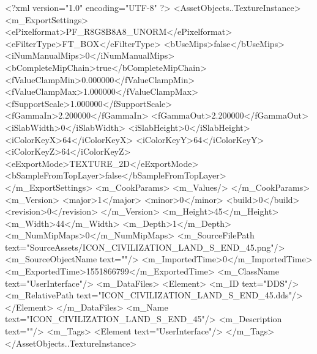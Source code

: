 <?xml version="1.0" encoding="UTF-8" ?>
<AssetObjects..TextureInstance>
	<m_ExportSettings>
		<ePixelformat>PF_R8G8B8A8_UNORM</ePixelformat>
		<eFilterType>FT_BOX</eFilterType>
		<bUseMips>false</bUseMips>
		<iNumManualMips>0</iNumManualMips>
		<bCompleteMipChain>true</bCompleteMipChain>
		<fValueClampMin>0.000000</fValueClampMin>
		<fValueClampMax>1.000000</fValueClampMax>
		<fSupportScale>1.000000</fSupportScale>
		<fGammaIn>2.200000</fGammaIn>
		<fGammaOut>2.200000</fGammaOut>
		<iSlabWidth>0</iSlabWidth>
		<iSlabHeight>0</iSlabHeight>
		<iColorKeyX>64</iColorKeyX>
		<iColorKeyY>64</iColorKeyY>
		<iColorKeyZ>64</iColorKeyZ>
		<eExportMode>TEXTURE_2D</eExportMode>
		<bSampleFromTopLayer>false</bSampleFromTopLayer>
	</m_ExportSettings>
	<m_CookParams>
		<m_Values/>
	</m_CookParams>
	<m_Version>
		<major>1</major>
		<minor>0</minor>
		<build>0</build>
		<revision>0</revision>
	</m_Version>
	<m_Height>45</m_Height>
	<m_Width>44</m_Width>
	<m_Depth>1</m_Depth>
	<m_NumMipMaps>0</m_NumMipMaps>
	<m_SourceFilePath text="SourceAssets/ICON_CIVILIZATION_LAND_S_END_45.png"/>
	<m_SourceObjectName text=""/>
	<m_ImportedTime>0</m_ImportedTime>
	<m_ExportedTime>1551866799</m_ExportedTime>
	<m_ClassName text="UserInterface"/>
	<m_DataFiles>
		<Element>
			<m_ID text="DDS"/>
			<m_RelativePath text="ICON_CIVILIZATION_LAND_S_END_45.dds"/>
		</Element>
	</m_DataFiles>
	<m_Name text="ICON_CIVILIZATION_LAND_S_END_45"/>
	<m_Description text=""/>
	<m_Tags>
		<Element text="UserInterface"/>
	</m_Tags>
</AssetObjects..TextureInstance>

